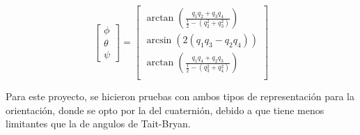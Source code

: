     \begin{equation}
        \begin{bmatrix}
            \phi \\ \theta \\ \psi 
        \end{bmatrix} =
            \begin{bmatrix}
                \arctan \left (\frac{q_1q_2 + q_3q_4}{\frac{1}{2}-(q^2_2+q^2_3)} \right ) \\
                \arcsin  (2(q_1q_3-q_2q_4)) \\
                \arctan \left (\frac{q_1q_4 + q_2q_3}{\frac{1}{2}-(q^2_3+q^2_4)} \right ) \\
            \end{bmatrix}
    \end{equation}

    Para este proyecto, se hicieron pruebas con ambos tipos de representación para la orientación, 
    donde se opto por la del cuaternión, debido a que tiene menos limitantes que la de angulos de Tait-Bryan.

